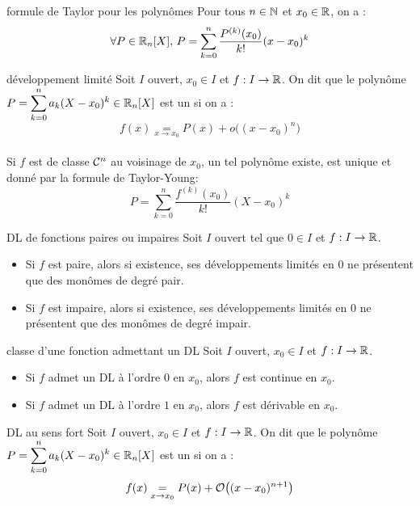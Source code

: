 \begin{adjustwidth}{-3cm}{-3cm}
\begin{proposition}{25.34}{formule de Taylor pour les polynômes}
    Pour tous $n \in \mathbb{N}$ et $x_0 \in \mathbb{R}$, on a :
    $$\forall P \in \mathbb{R}_n[X],\, P = \sum_{k=0}^{n}\frac{P^{(k)}(x_0)}{k!}(x-x_0)^k$$
\end{proposition}

\begin{definition}{25.36}{développement limité}
    Soit $I$ ouvert, $x_0 \in I$ et $f:I \to \mathbb{R}$. On dit que le polynôme $ \displaystyle P = \sum_{k=0}^{n}a_k(X - x_0)^k \in \mathbb{R}_n[X]$ est un  si on a :\\
    $$f(x) \underset{x \to x_0}{=}  P(x) + o\bigl((x-x_0)^n\bigr)$$ \\
    Si $f$ est de classe $\mathcal{C}^{n}$ au voisinage de $x_0$, un tel polynôme existe, est unique et donné par la formule de Taylor-Young:
    $$P = \sum_{k=0}^{n}\frac{f^{(k)}(x_0)}{k!}(X-x_0)^k$$
\end{definition}

\begin{proposition}{25.41}{DL de fonctions paires ou impaires}
    Soit $I$ ouvert tel que $0 \in I$ et $f:I \to \mathbb{R}$. \begin{itemize}
        \item Si $f$ est paire, alors si existence, ses développements limités en 0 ne présentent que des monômes de degré pair.
        \item Si $f$ est impaire, alors si existence, ses développements limités en 0 ne présentent que des monômes de degré impair.
    \end{itemize}
\end{proposition}

\begin{proposition}{25.42}{classe d'une fonction admettant un DL}
    Soit $I$ ouvert, $x_0 \in I$ et $f:I \to \mathbb{R}$.
    \begin{itemize}
        \item Si $f$ admet un DL à l’ordre $0$ en $x_0$, alors $f$ est continue en $x_0$.
        \item Si $f$ admet un DL à l’ordre $1$ en $x_0$, alors $f$ est dérivable en $x_0$.
    \end{itemize}
\end{proposition}

\begin{definition}{25.44}{DL au sens fort}
    Soit $I$ ouvert, $x_0 \in I$ et $f:I \to \mathbb{R}$. On dit que le polynôme $ \displaystyle P = \sum_{k=0}^{n}a_k(X - x_0)^k \in \mathbb{R}_n[X]$ est un  si on a :\\
    $$f(x) \underset{x \to x_0}{=}  P(x) + \mathcal{O}\bigl((x-x_0)^{n+1}\bigr)$$
\end{definition}


\end{adjustwidth}
